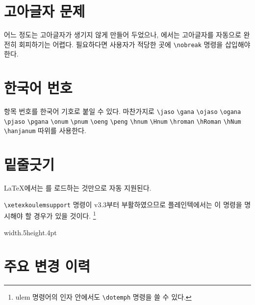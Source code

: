 \documentclass[a4paper]{article}
\def\logoko{\textsf{k}\kern-.2ex\textit{o}}
\def\XeTeX{\hologo{XeTeX}}
\def\kotex{\logoko\kern-.1ex .\kern-.1667em \hologo{TeX}}
\def\cs#1{\texttt{\textbackslash #1}}
\begin{document}
\section{고아글자 문제}
어느 정도는 고아글자가 생기지 않게 만들어 두었으나,
\XeTeX 에서는 고아글자를 자동으로 완전히 회피하기는 어렵다.
필요하다면 사용자가 적당한 곳에 \cs{nobreak} 명령을 삽입해야 한다.

\section{한국어 번호}
항목 번호를 한국어 기호로 붙일 수 있다.  마찬가지로
\cs{jaso} \cs{gana} \cs{ojaso} \cs{ogana} \cs{pjaso}
\cs{pgana} \cs{onum} \cs{pnum} \cs{oeng} \cs{peng}
\cs{hnum} \cs{Hnum} \cs{hroman} \cs{hRoman} \cs{hNum}
\cs{hanjanum}
따위를 사용한다.

\section{밑줄긋기}
\LaTeX 에서는 를 로드하는 것만으로 자동 지원된다.

\cs{xetexkoulemsupport} 명령이 v3.3부터 부활하였으므로
플레인텍에서는 이 명령을 명시해야 할 경우가 있을 것이다.%
\footnote{%
  ulem 명령어의 인자 안에서도 \cs{dotemph} 명령을 쓸 수 있다.
}



\bigskip
\centerline{\hfil\vrule width.5\textwidth height.4pt \relax\hfil}

\section*{주요 변경 이력}
\end{document}
